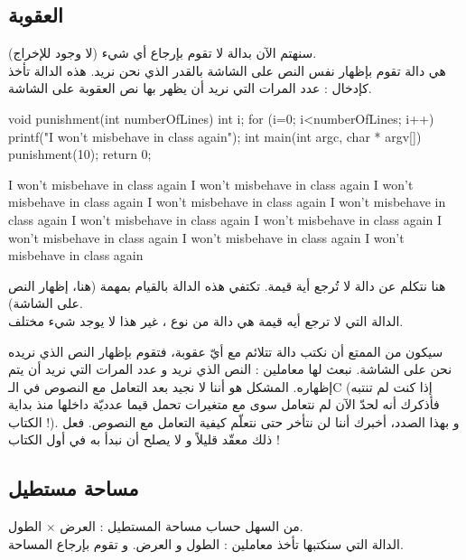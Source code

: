 \subsection{العقوبة}

سنهتم الآن بدالة لا تقوم بإرجاع أي شيء (لا وجود للإخراج).\\
هي دالة تقوم بإظهار نفس النص على الشاشة بالقدر الذي نحن نريد. هذه الدالة تأخذ كإدخال : عدد المرات التي نريد أن يظهر بها نص العقوبة على الشاشة.

\begin{Csource}
void punishment(int numberOfLines)
{
	int i;
	for (i=0; i<numberOfLines; i++){
		printf("I won't misbehave in class again\n");
	}
}
int main(int argc, char * argv[])
{
	punishment(10);
	return 0;
}
\end{Csource}

\begin{Console}
I won't misbehave in class again
I won't misbehave in class again
I won't misbehave in class again
I won't misbehave in class again
I won't misbehave in class again
I won't misbehave in class again
I won't misbehave in class again
I won't misbehave in class again
I won't misbehave in class again
I won't misbehave in class again
\end{Console}

هنا نتكلم عن دالة لا تُرجع أية قيمة. تكتفي هذه الدالة بالقيام بمهمة (هنا، إظهار النص على الشاشة).\\
الدالة التي لا ترجع أيه قيمة هي دالة من نوع 
،
غير هذا لا يوجد شيء مختلف.

سيكون من الممتع أن نكتب دالة 
تتلائم مع أيّ عقوبة، فتقوم بإظهار النص الذي نريده نحن على الشاشة. نبعث لها معاملين : النص الذي نريد و عدد المرات التي نريد أن يتم إظهاره. المشكل هو أننا لا نجيد بعد التعامل مع النصوص في الـ\textenglish{C}
(إذا كنت لم تنتبه فأذكرك أنه لحدّ الآن لم نتعامل سوى مع متغيرات تحمل قيما عدديّة داخلها منذ بداية الكتاب !). و بهذا الصدد، أخبرك أننا لن نتأخر حتى نتعلّم كيفية التعامل مع النصوص. فعل ذلك معقّد قليلاً و لا يصلح أن نبدأ به في أول الكتاب !

\subsection{مساحة مستطيل}

من السهل حساب مساحة المستطيل : العرض $\times$ الطول.\\
الدالة التي سنكتبها
تأخذ معاملين : الطول و العرض. و تقوم بإرجاع المساحة.

